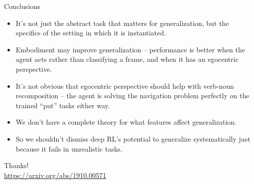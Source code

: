 \documentclass{beamer}
\begin{document}
\begin{frame}{Conclusions}
\begin{itemize}
\item It's not just the abstract task that matters for generalization, but the specifics of the setting in which it is instantiated. 
\item Embodiment may improve generalization -- performance is better when the agent acts rather than classifying a frame, and when it has an egocentric perspective.
\item It's not obvious that egocentric perspective should help with verb-noun recomposition -- the agent is solving the navigation problem perfectly on the trained ``put'' tasks either way.
\item We don't have a complete theory for what features affect generalization.
\item So we shouldn't dismiss deep RL's potential to generalize systematically just because it fails in unrealistic tasks. 
\end{itemize}
\end{frame}

\begin{frame}[standout]
Thanks!\\
\url{https://arxiv.org/abs/1910.00571}
\end{frame}
\end{document}
